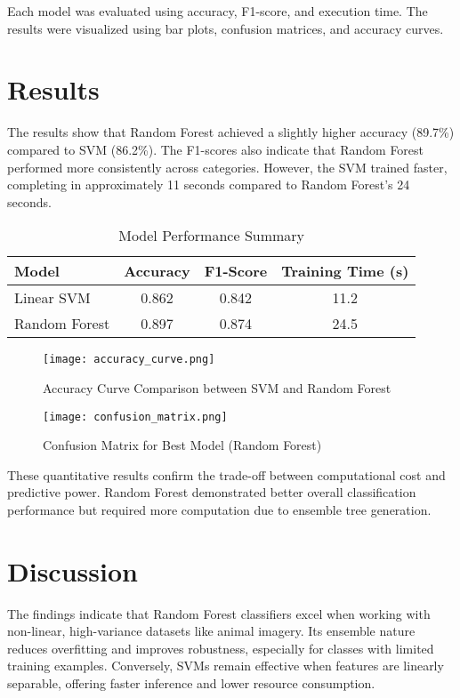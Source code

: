 \documentclass[conference]{IEEEtran}
\begin{document}
Each model was evaluated using accuracy, F1-score, and execution time. The results were visualized using bar plots, confusion matrices, and accuracy curves.

\section{Results}
The results show that Random Forest achieved a slightly higher accuracy (89.7\%) compared to SVM (86.2\%). The F1-scores also indicate that Random Forest performed more consistently across categories. However, the SVM trained faster, completing in approximately 11 seconds compared to Random Forest’s 24 seconds.

\begin{table}[H]
\centering
\caption{Model Performance Summary}
\begin{tabular}{lccc}
\toprule
\textbf{Model} & \textbf{Accuracy} & \textbf{F1-Score} & \textbf{Training Time (s)} \\
\midrule
Linear SVM & 0.862 & 0.842 & 11.2 \\
Random Forest & 0.897 & 0.874 & 24.5 \\
\bottomrule
\end{tabular}
\end{table}

\begin{figure}[H]
\centering
\texttt{[image: accuracy\_curve.png]}
\caption{Accuracy Curve Comparison between SVM and Random Forest}
\end{figure}

\begin{figure}[H]
\centering
\texttt{[image: confusion\_matrix.png]}
\caption{Confusion Matrix for Best Model (Random Forest)}
\end{figure}

These quantitative results confirm the trade-off between computational cost and predictive power. Random Forest demonstrated better overall classification performance but required more computation due to ensemble tree generation.

\section{Discussion}
The findings indicate that Random Forest classifiers excel when working with non-linear, high-variance datasets like animal imagery. Its ensemble nature reduces overfitting and improves robustness, especially for classes with limited training examples. Conversely, SVMs remain effective when features are linearly separable, offering faster inference and lower resource consumption.  
\vspace{3pt}
\end{document}
